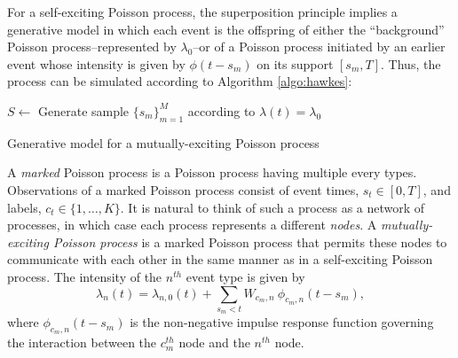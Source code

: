 		For a self-exciting Poisson process, the superposition principle implies a generative model in which each event is the offspring of either the ``background'' Poisson process--represented by $\lambda_0$--or of a Poisson process initiated by an earlier event whose intensity is given by $\phi(t-s_m)$ on its support $[s_m, T]$. Thus, the process can be simulated according to Algorithm \ref{algo:hawkes}:

		\begin{algorithm}
				\begin{algorithmic}
					\vspace{1mm}
					\STATE $S \gets$ Generate sample $\{s_m\}_{m=1}^M$ according to $\lambda(t) = \lambda_0$
					\REPEAT
						\ENDFOR
			\end{algorithmic}
			\caption{Generative model for a mutually-exciting Poisson process}
			\label{algo:hawkes}
		\end{algorithm}


		A \textit{marked} Poisson process is a Poisson process having multiple every types. Observations of a marked Poisson process consist of event times, $s_t \in [0, T]$, and labels, $c_t \in \{1, \dots, K\}$. It is natural to think of such a process as a network of processes, in which case each process represents a different \textit{nodes}. A \textit{mutually-exciting Poisson process} is a marked Poisson process that permits these nodes to communicate with each other in the same manner as in a self-exciting Poisson process. The intensity of the $n^{th}$ event type is given by
		\begin{equation} \label{eq:hawkes-intensity}
			\lambda_{n}(t) = \lambda_{n, 0}(t) + \sum_{s_m < t} W_{c_m, n} \ \phi_{c_m, n}(t-s_m),
		\end{equation}
		where $\phi_{c_m, n}(t-s_m)$ is the non-negative impulse response function governing the interaction between the $c_m^{th}$ node and the $n^{th}$ node.

